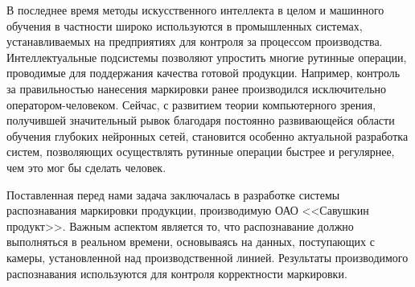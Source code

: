 В последнее время методы искусственного интеллекта в целом и машинного обучения в частности широко используются в промышленных системах, устанавливаемых на предприятиях для контроля за процессом производства. Интеллектуальные подсистемы позволяют упростить многие рутинные операции, проводимые для поддержания качества готовой продукции. Например, контроль за правильностью нанесения маркировки ранее производился исключительно оператором-человеком. Сейчас, с развитием теории компьютерного зрения, получившей значительный рывок благодаря постоянно развивающейся области обучения глубоких нейронных сетей, становится особенно актуальной разработка систем, позволяющих осуществлять рутинные операции быстрее и регулярнее, чем это мог бы сделать человек.

Поставленная перед нами задача заключалась в разработке системы распознавания маркировки продукции, производимую ОАО <<Савушкин продукт>>. Важным аспектом является то, что распознавание должно выполняться в реальном времени, основываясь на данных, поступающих с камеры, установленной над производственной линией. Результаты производимого распознавания используются для контроля корректности маркировки.





